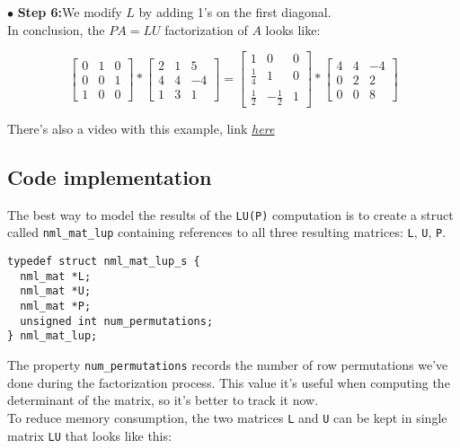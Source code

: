 $\bullet$ {\bf Step 6:}\quad We modify $L$ by adding 1's on the first diagonal.
\\

In conclusion, the $PA=LU$ factorization of $A$ looks like:

$$
\begin{bmatrix}
0 & 1 & 0 \\
0 & 0 & 1 \\
1 & 0 & 0
\end{bmatrix}
*
\begin{bmatrix}
2 & 1 & 5 \\
4 & 4 & -4 \\
1 & 3 & 1  
\end{bmatrix}
=
\begin{bmatrix}
1 & 0 & 0 \\
\frac{1}{4} & 1 & 0 \\
\frac{1}{2} & -\frac{1}{2} & 1
\end{bmatrix}
*
\begin{bmatrix}
4 & 4 & -4 \\
0 & 2 & 2  \\
0 & 0 & 8
\end{bmatrix}
$$

There's also a video  with this example, link \href{https://www.youtube.com/watch?v=f6RT4BI4S7M}{\underline{\it here}}

\subsection{Code implementation}

The best way to model the results of the {\tt LU(P)} computation is to create a struct called {\tt nml\_mat\_lup} containing references to all three resulting matrices: {\tt L}, {\tt U}, {\tt P}.
\\

\begin{verbatim}
typedef struct nml_mat_lup_s {
  nml_mat *L;
  nml_mat *U;
  nml_mat *P;
  unsigned int num_permutations;
} nml_mat_lup;
\end{verbatim}

The property {\tt num\_permutations} records the number of row permutations we’ve done during the factorization process. This value it’s useful when computing the determinant of the matrix, so it’s better to track it now.
\\

To reduce memory consumption, the two matrices {\tt L} and {\tt U} can be kept in single matrix {\tt LU} that looks like this:

